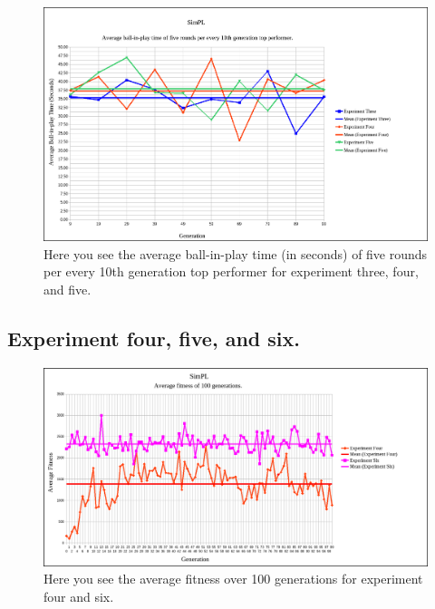 \documentclass[a4paper,10pt]{article}
\begin{document}
\begin{figure}[H]  
  \centering
  \includegraphics[width=1\textwidth]{figures/exp345_10_tops_times.png}
  \caption{Here you see the average ball-in-play time (in seconds) of five rounds per every 10th generation top performer for experiment three, four, and five.}
  \label{fig:exp345_10_tops_times}
\end{figure}

\subsection{Experiment four, five, and six.}

\begin{figure}[H]  
  \centering
  \includegraphics[width=1\textwidth]{figures/exp46_avg_fit.png}
  \caption{Here you see the average fitness over 100 generations for experiment four and six.}
  \label{fig:exp46_avg_fit}
\end{figure}
\end{document}
